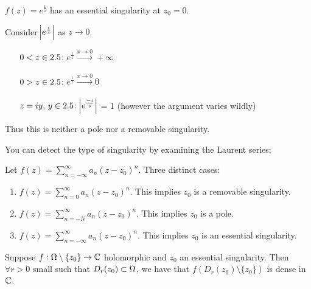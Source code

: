 \begin{example}
$f(z) = e^{\frac{1}{z}}$ has an essential singularity at $z_0 = 0$.

Consider $\abs{e^{\frac{1}{z}}}$ as $z\to 0$.

\begin{enumerate}
    \item[$0<z \in 2.5$:] $e^{\frac{1}{z}} \xrightarrow[]{x \to 0} +\infty$\\
    \item[$0>z \in 2.5$:] $e^{\frac{1}{z}} \xrightarrow[]{x \to 0} 0$\\
    \item[$z = iy,\, y \in 2.5$:] $\abs{e^{\frac{-i}{y}}}$ = 1 (however the argument varies wildly)
\end{enumerate}

Thus this is neither a pole nor a removable singularity.
\end{example}

You can detect the type of singularity by examining the Laurent series:

\begin{note}
Let $f(z) = \sum_{n=-\infty}^\infty a_n (z-z_0)^n$. Three distinct cases:

\begin{enumerate}
    \item $f(z) = \sum_{n=0}^\infty a_n (z-z_0)^n$. This implies $z_0$ is a removable singularity.
    
    \item $f(z) = \sum_{n=-N}^\infty a_n (z-z_0)^n$. This implies $z_0$ is a pole.
    
    \item $f(z) = \sum_{n=-\infty}^\infty a_n (z-z_0)^n$. This implies $z_0$ is an essential singularity.
\end{enumerate}


\end{note}

\begin{theorem}

Suppose $f: \Omega \setminus \{ z_0 \} \to \mathbb{C}$ holomorphic and $z_0$ an essential singularity. Then $\forall r> 0$ small such that $D_r(z_0) \subset \Omega$, we have that $f(D_r(z_0) \setminus \{ z_0 \})$ is dense in $\mathbb{C}$.
\end{theorem}



